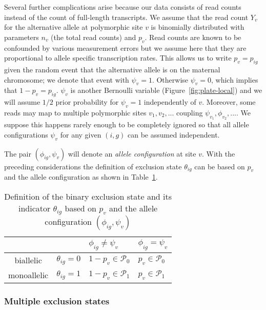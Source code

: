 \documentclass[letterpaper]{article}
\begin{document}
Several further complications arise because our data consists of read counts
instead of the count of full-length transcripts.  We assume that the read
count \(Y_v\) for the alternative allele at polymorphic site \(v\) is
binomially distributed with parameters \(n_v\) (the total read counts) and
\(p_{v}\).   Read counts are known to be confounded by various measurement
errors but we assume here that they are proportional to allele specific
transcription rates.  This allows us to write \(p_v = p_{ig}\) given the
random event that the alternative allele is on the maternal chromosome; we
denote that event with \(\psi_v=1\).  Otherwise \(\psi_v=0\), which implies
that \(1-p_v=p_{ig}\).  \(\psi_v\) is another Bernoulli variable
(Figure~\ref{fig:plate-local}) and we will assume \(1/2\) prior probability
for \(\psi_v=1\) independently of \(v\).  Moreover, some reads may map to
multiple polymorphic sites \(v_1,v_2,...\) coupling
\(\psi_{v_1},\phi_{v_2},...\).  We suppose this happens rarely enough to be
completely ignored so that all allele configurations \(\psi_v\) for any given
\((i,g)\) can be assumed independent.

The pair \((\phi_{ig},\psi_v)\) will denote an \emph{allele configuration} at
site \(v\).  With the preceding considerations the definition of exclusion
state \(\theta_{ig}\) can be based on \(p_v\) and the allele configuration as
shown in Table~\ref{tab:def-exclusion-state}.
\begin{table}[b]
\begin{center}
\begin{tabular}{cl|ll|}
& & \(\phi_{ig}\neq\psi_v\) & \(\phi_{ig}=\psi_v\) \\
\hline
biallelic & \(\theta_{ig}=0\) & \(1-p_v \in \mathcal{P}_0\) & \(p_v \in \mathcal{P}_0\) \\
monoallelic & \(\theta_{ig}=1\) & \(1-p_v \in \mathcal{P}_1\) & \(p_v \in \mathcal{P}_1\) \\
\hline
\end{tabular}
\caption{
Definition of the binary exclusion state and its indicator \(\theta_{ig}\) based on
\(p_v\) and the allele configuration \((\phi_{ig},\psi_v)\)
}
\label{tab:def-exclusion-state}
\end{center}
\end{table}

\subsubsection{Multiple exclusion states}
\label{sec:local-multinomial}
\end{document}
